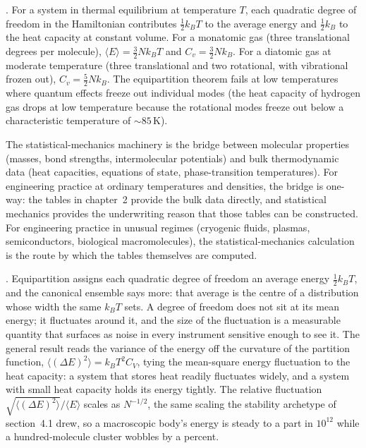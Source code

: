 . For a system in thermal equilibrium at
temperature $T$, each quadratic degree of freedom in the
Hamiltonian contributes $\frac{1}{2} k_B T$ to the average energy and
$\frac{1}{2} k_B$ to the heat capacity at constant volume. For a
monatomic gas (three translational degrees per molecule), $\langle E
\rangle = \frac{3}{2} N k_B T$ and $C_v = \frac{3}{2} N k_B$. For a
diatomic gas at moderate temperature (three translational and two
rotational, with vibrational frozen out), $C_v = \frac{5}{2} N k_B$.
The equipartition theorem fails at low temperatures where quantum
effects freeze out individual modes (the heat capacity of hydrogen
gas drops at low temperature because the rotational modes freeze
out below a characteristic temperature of $\sim 85\,\si{\kelvin}$).

The statistical-mechanics machinery is the bridge between molecular
properties (masses, bond strengths, intermolecular potentials) and
bulk thermodynamic data (heat capacities, equations of state,
phase-transition temperatures). For engineering practice at
ordinary temperatures and densities, the bridge is one-way: the
tables in chapter~2 provide the bulk data directly, and statistical
mechanics provides the underwriting reason that those tables can be
constructed. For engineering practice in unusual regimes (cryogenic
fluids, plasmas, semiconductors, biological macromolecules), the
statistical-mechanics calculation is the route by which the tables
themselves are computed.

. Equipartition assigns each
quadratic degree of freedom an average energy $\tfrac12 k_B T$, and the
canonical ensemble says more: that average is the centre of a distribution
whose width the same $k_B T$ sets. A degree of freedom does not sit at its
mean energy; it fluctuates around it, and the size of the fluctuation is a
measurable quantity that surfaces as noise in every instrument sensitive
enough to see it. The general result reads the variance of the energy off
the curvature of the partition function, $\langle (\Delta E)^2\rangle =
k_B T^2 C_V$, tying the mean-square energy fluctuation to the heat capacity:
a system that stores heat readily fluctuates widely, and a system with small
heat capacity holds its energy tightly. The relative fluctuation
$\sqrt{\langle(\Delta E)^2\rangle}/\langle E\rangle$ scales as $N^{-1/2}$,
the same scaling the stability archetype of section~4.1 drew, so a
macroscopic body's energy is steady to a part in $10^{12}$ while a
hundred-molecule cluster wobbles by a percent.

